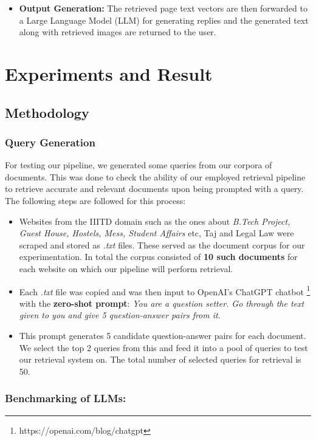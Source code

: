 \documentclass[sigconf,natbib=true,anonymous=false]{acmart}
\begin{document}
\begin{itemize}
\item \textbf{Output Generation:} The retrieved page text vectors are then forwarded to a Large Language Model (LLM) for generating replies and the generated text along with retrieved images are returned to the user.
\end{itemize}

\section{Experiments and Result}
\subsection{Methodology}
\subsubsection{\textbf{Query Generation}}
For testing our pipeline, we generated some queries from our corpora of documents. This was done to check the ability of our employed retrieval pipeline to retrieve accurate and relevant documents upon being prompted with a query. The following steps are followed for this process:
\begin{itemize}
    \item Websites from the IIITD domain such as the ones about \textit{B.Tech Project, Guest House, Hostels, Mess, Student Affairs} etc, Taj and Legal Law were scraped and stored as \textit{.txt} files. These served as the document corpus for our experimentation. In total the corpus consisted of \textbf{10 such documents} for each website on which our pipeline will perform retrieval.
    \item Each \textit{.txt} file was copied and was then input to OpenAI's ChatGPT chatbot \footnote{https://openai.com/blog/chatgpt} with the \textbf{zero-shot prompt}: \newline \emph{You are a question setter. Go through the text given to you and give 5 question-answer pairs from it}.
    \item This prompt generates 5 candidate question-answer pairs for each document. We select the top 2 queries from this and feed it into a pool of queries to test our retrieval system on. The total number of selected queries for retrieval is 50.
\end{itemize}

\subsubsection{\textbf{Benchmarking of LLMs: }}
\end{document}
